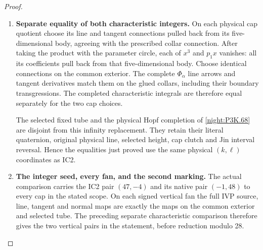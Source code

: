 \begin{proof}
\begin{enumerate}[label=\arabic*.]
The relation-basis map (ICAP.17) leaves the original physical
circle and its line unchanged. On the identical selected
Hopf boundary its Euler restriction in the basis
(fixed sphere, complex meridian) is \((0,-1)\), through
the tautological line of the held-Cox product. The actual
orbit-cap and conifold restriction matrices are respectively
\[
 \begin{pmatrix}0&-1\\-1&0\end{pmatrix},\qquad
 \begin{pmatrix}0&0\\-1&-1\end{pmatrix}.                 \tag{ICAP.18}
\]
The first is unimodular; the second has primitive kernel
\((1,-1)\) and primitive cokernel. These explicit Hopf and
Gysin maps retain the characteristic orientation for both
norm signs. The IF3/AFI primitive common-link maps carry
the same oriented homotopy-sphere property through each
finite selected-fan replacement.

\item \textbf{Separate equality of both characteristic integers.}
On each physical cap quotient choose its line and tangent
connections pulled back from its five-dimensional body,
agreeing with the prescribed collar connection. After taking
the product with the parameter circle, each of \(x^3\)
and \(p_1x\) vanishes: all its coefficients pull back from
that five-dimensional body. Choose identical connections
on the common exterior. The complete \(\Phi_\alpha\)
line arrows and tangent derivatives match them on the
glued collars, including their boundary transgressions.
The completed characteristic integrals are therefore equal
separately for the two cap choices.

The selected fixed tube and the physical Hopf completion
of \cref{night:P3K.68} are disjoint from this infinity
replacement. They retain their literal quaternion, original
physical line, selected height, cap clutch and Jin interval
reversal. Hence the equalities just proved use the same
physical \((k,\ell)\) coordinates as IC2.

\item \textbf{The integer seed, every fan, and the second marking.}
The actual comparison carries the IC2 pair \((47,-4)\)
and its native pair \((-1,48)\) to every cap in the stated
scope. On each signed vertical fan the full IVP source,
line, tangent and normal maps are exactly the maps on the
common exterior and selected tube. The preceding separate
characteristic comparison therefore gives the two vertical
pairs in the statement, before reduction modulo 28.


\end{enumerate}
\end{proof}
